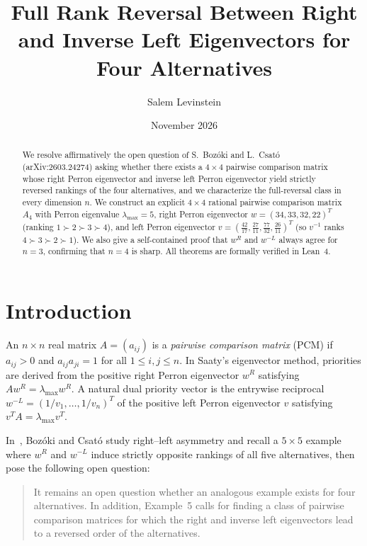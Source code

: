 \documentclass[11pt]{article}
\title{Full Rank Reversal Between Right and Inverse Left Eigenvectors for Four Alternatives}
\author{Salem Levinstein}
\date{November 2026}
\begin{document}
\maketitle

\begin{abstract}
We resolve affirmatively the open question of S.~Boz\'oki and L.~Csat\'o
(arXiv:2603.24274) asking whether there exists a $4 \times 4$ pairwise
comparison matrix whose right Perron eigenvector and inverse left Perron
eigenvector yield strictly reversed rankings of the four alternatives, and we
characterize the full-reversal class in every dimension $n$. We construct an
explicit $4 \times 4$ rational pairwise comparison matrix $A_4$ with Perron
eigenvalue $\lambda_{\max} = 5$, right Perron eigenvector
$w = (34, 33, 32, 22)^T$ (ranking $1 \succ 2 \succ 3 \succ 4$), and left
Perron eigenvector
$v = (\frac{42}{17}, \frac{27}{11}, \frac{77}{32}, \frac{26}{11})^T$ (so
$v^{-1}$ ranks $4 \succ 3 \succ 2 \succ 1$). We also give a self-contained
proof that $w^R$ and $w^{-L}$ always agree for $n = 3$, confirming that
$n = 4$ is sharp. All theorems are formally verified in Lean~4.
\end{abstract}

\section{Introduction}

An $n \times n$ real matrix $A = (a_{ij})$ is a \emph{pairwise comparison
matrix} (PCM) if $a_{ij} > 0$ and $a_{ij} a_{ji} = 1$ for all $1 \le i, j \le n$.
In Saaty's eigenvector method, priorities are derived from the positive right
Perron eigenvector $w^R$ satisfying $A w^R = \lambda_{\max} w^R$. A natural
dual priority vector is the entrywise reciprocal $w^{-L} = (1/v_1, \dots, 1/v_n)^T$
of the positive left Perron eigenvector $v$ satisfying
$v^T A = \lambda_{\max} v^T$.

In~\cite{BC2026}, Bozóki and Csató study right--left asymmetry and recall a
$5 \times 5$ example where $w^R$ and $w^{-L}$ induce strictly opposite rankings
of all five alternatives, then pose the following open question:
\begin{quote}
It remains an open question whether an analogous example exists for four
alternatives. In addition, Example~5 calls for finding a class of pairwise
comparison matrices for which the right and inverse left eigenvectors lead to
a reversed order of the alternatives.
\end{quote}
\end{document}
